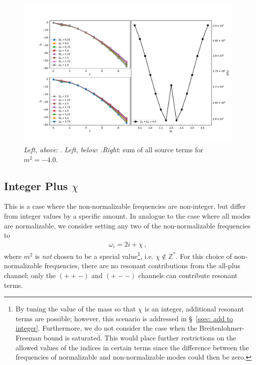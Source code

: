 \documentclass[letterpaper,11pt]{article}
\newcommand{\oi}{\omega_i}
\begin{document}
\begin{figure}
\centering
\includegraphics[width=\textwidth]{./figures/NN_equalfreq_source_n2_m-4_0}
\caption{{\it Left, above}: . {\it Left, below}: .{\it Right}: sum of all source terms for $m^2 = -4.0$.}
\label{fig:atoi_all_m-4_0}
\end{figure}


\subsection{Integer Plus $\chi$}

This is a case where the non-normalizable frequencies are non-integer, but differ from integer values by a specific amount. In analogue to the case where all modes are normalizable, we consider setting any two of the non-normalizable frequencies to
\begin{align}
\oi = 2i + \chi \, ,
\end{align}
where $m^2$ is \emph{not} chosen to be a special value\footnote{By tuning the value of the mass so that $\chi$ is an integer, additional resonant terms are possible; however, this scenario is addressed in \S\!~\ref{ssec: add to integer}. Furthermore, we do not consider the case when the Breitenlohmer-Freeman bound is saturated. This would place further restrictions on the allowed values of the indices in certain terms since the difference between the frequencies of normalizable and non-normalizable modes could then be zero.}, i.e. $\chi \notin \mathbb{Z}^*$. For this choice of non-normalizable frequencies, there are no resonant contributions from the all-plus channel; only the $(++-)$ and $(+--)$ channels can contribute resonant terms.
\end{document}

